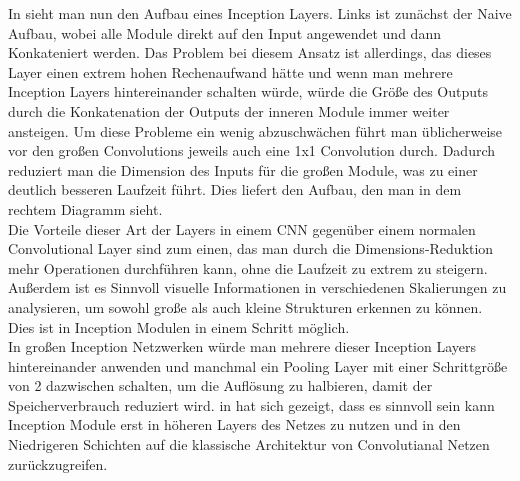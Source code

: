 \documentclass[runningheads,a4paper]{llncs}[2015/06/24]
\begin{document}
In  sieht man nun den Aufbau eines Inception Layers. Links ist zunächst der Naive Aufbau, wobei alle Module direkt auf den Input angewendet und dann Konkateniert werden. Das Problem bei diesem Ansatz ist allerdings, das dieses Layer einen extrem hohen Rechenaufwand hätte und wenn man mehrere Inception Layers hintereinander schalten würde, würde die Größe des Outputs durch die Konkatenation der Outputs der inneren Module immer weiter ansteigen.
Um diese Probleme ein wenig abzuschwächen führt man üblicherweise vor den großen Convolutions jeweils auch eine 1x1 Convolution durch. Dadurch reduziert man die Dimension des Inputs für die großen Module, was zu einer deutlich besseren Laufzeit führt. Dies liefert den Aufbau, den man in dem rechtem Diagramm sieht.\\
Die Vorteile dieser Art der Layers in einem CNN gegenüber einem normalen Convolutional Layer sind zum einen, das man durch die Dimensions-Reduktion mehr Operationen durchführen kann, ohne die Laufzeit zu extrem zu steigern. Außerdem ist es Sinnvoll visuelle Informationen in verschiedenen Skalierungen zu analysieren, um sowohl große als auch kleine Strukturen erkennen zu können. Dies ist in Inception Modulen in einem Schritt möglich.\\
In großen Inception Netzwerken würde man mehrere dieser Inception Layers hintereinander anwenden und manchmal ein Pooling Layer mit einer Schrittgröße von 2 dazwischen schalten, um die Auflösung zu halbieren, damit der Speicherverbrauch reduziert wird. in \cite{inception_paper} hat sich gezeigt, dass es sinnvoll sein kann Inception Module erst in höheren Layers des Netzes zu nutzen und in den Niedrigeren Schichten auf die klassische Architektur von Convolutianal Netzen zurückzugreifen.
\end{document}
